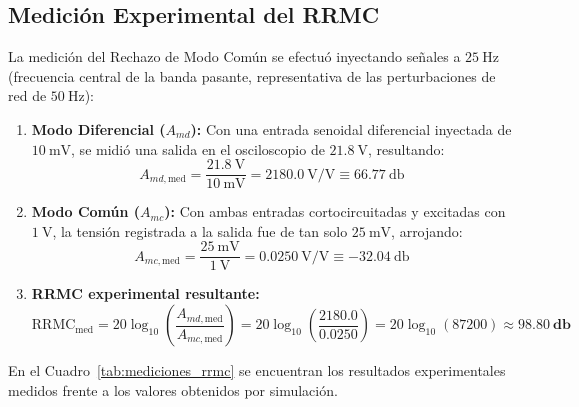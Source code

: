 \subsection{Medición Experimental del RRMC}
La medición del Rechazo de Modo Común se efectuó inyectando señales a $\SI{25}{\hertz}$ (frecuencia central de la banda pasante, representativa de las perturbaciones de red de $\SI{50}{\hertz}$):
\begin{enumerate}
  \item \textbf{Modo Diferencial ($A_{md}$):} Con una entrada senoidal diferencial inyectada de $\SI{10}{\milli\volt}$, se midió una salida en el osciloscopio de $\SI{21.8}{\volt}$, resultando:
  \begin{equation*}
    A_{md,\text{med}} = \frac{\SI{21.8}{\volt}}{\SI{10}{\milli\volt}} = 2180.0\ \text{V/V} \equiv \SI{66.77}{\decibel}
  \end{equation*}
  \item \textbf{Modo Común ($A_{mc}$):} Con ambas entradas cortocircuitadas y excitadas con $\SI{1}{\volt}$, la tensión registrada a la salida fue de tan solo $\SI{25}{\milli\volt}$, arrojando:
  \begin{equation*}
    A_{mc,\text{med}} = \frac{\SI{25}{\milli\volt}}{\SI{1}{\volt}} = 0.0250\ \text{V/V} \equiv -\SI{32.04}{\decibel}
  \end{equation*}
  \item \textbf{RRMC experimental resultante:}
  \begin{equation*}
    \text{RRMC}_{\text{med}} = 20 \log_{10} \left( \frac{A_{md,\text{med}}}{A_{mc,\text{med}}} \right) = 20 \log_{10} \left( \frac{2180.0}{0.0250} \right) = 20 \log_{10}(87200) \approx \mathbf{\SI{98.80}{\decibel}}
  \end{equation*}
\end{enumerate}

En el Cuadro~\ref{tab:mediciones_rrmc} se encuentran los resultados
experimentales medidos frente a los valores obtenidos por simulación.

